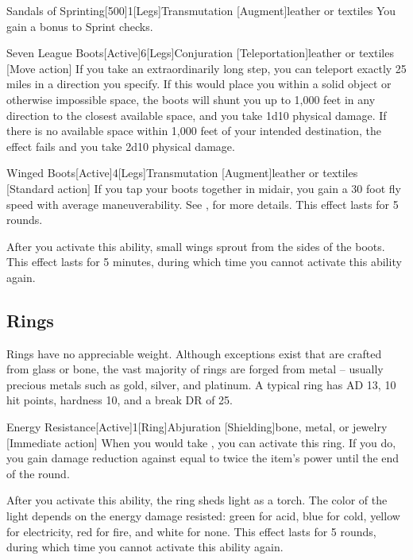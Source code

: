         \begin{magicitemdef}{Sandals of Sprinting}[500]{1}[Legs]{Transmutation [Augment]}{leather or textiles}
             You gain a  bonus to Sprint checks.
        \end{magicitemdef}

        \begin{magicitemdef}{Seven League Boots}[Active]{6}[Legs]{Conjuration [Teleportation]}{leather or textiles}
            [Move action] If you take an extraordinarily long step, you can teleport exactly 25 miles in a direction you specify.
            If this would place you within a solid object or otherwise impossible space, the boots will shunt you up to 1,000 feet in any direction to the closest available space, and you take 1d10 physical damage.
            If there is no available space within 1,000 feet of your intended destination, the effect fails and you take 2d10 physical damage.
        \end{magicitemdef}

        \begin{magicitemdef}{Winged Boots}[Active]{4}[Legs]{Transmutation [Augment]}{leather or textiles}
            [Standard action] If you tap your boots together in midair, you gain a 30 foot fly speed with average maneuverability.
            See , for more details.
            This effect lasts for 5 rounds.

            After you activate this ability, small wings sprout from the sides of the boots.
            This effect lasts for 5 minutes, during which time you cannot activate this ability again.
        \end{magicitemdef}

    \subsection{Rings}

         Rings have no appreciable weight.
        Although exceptions exist that are crafted from glass or bone, the vast majority of rings are forged from metal -- usually precious metals such as gold, silver, and platinum.
        A typical ring has AD 13, 10 hit points, hardness 10, and a break DR of 25.

        \begin{magicitemdef}{Energy Resistance}[Active]{1}[Ring]{Abjuration [Shielding]}{bone, metal, or jewelry}
            [Immediate action] When you would take , you can activate this ring.
            If you do, you gain damage reduction against  equal to twice the item's power until the end of the round.

            After you activate this ability, the ring sheds light as a torch.
            The color of the light depends on the energy damage resisted: green for acid, blue for cold, yellow for electricity, red for fire, and white for none.
            This effect lasts for 5 rounds, during which time you cannot activate this ability again.
        \end{magicitemdef}

